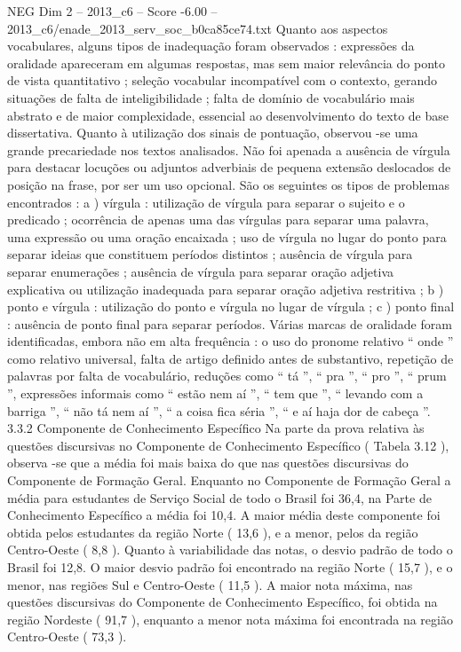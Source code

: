 \begin{textsample}{NEG Dim 2 – 2013\_c6 – Score -6.00 – 2013\_c6/enade\_2013\_serv\_soc\_b0ca85ce74.txt}
Quanto aos aspectos vocabulares, alguns tipos de inadequação foram observados : expressões da oralidade apareceram em algumas respostas, mas sem maior relevância do ponto de vista quantitativo ; seleção vocabular incompatível com o contexto, gerando situações de falta de inteligibilidade ; falta de domínio de vocabulário mais abstrato e de maior complexidade, essencial ao desenvolvimento do texto de base dissertativa.
Quanto à utilização dos sinais de pontuação, observou -se uma grande precariedade nos textos analisados.
Não foi apenada a ausência de vírgula para destacar locuções ou adjuntos adverbiais de pequena extensão deslocados de posição na frase, por ser um uso opcional.
São os seguintes os tipos de problemas encontrados : a ) vírgula : utilização de vírgula para separar o sujeito e o predicado ; ocorrência de apenas uma das vírgulas para separar uma palavra, uma expressão ou uma oração encaixada ; uso de vírgula no lugar do ponto para separar ideias que constituem períodos distintos ; ausência de vírgula para separar enumerações ; ausência de vírgula para separar oração adjetiva explicativa ou utilização inadequada para separar oração adjetiva restritiva ; b ) ponto e vírgula : utilização do ponto e vírgula no lugar de vírgula ; c ) ponto final : ausência de ponto final para separar períodos.
Várias marcas de oralidade foram identificadas, embora não em alta frequência : o uso do pronome relativo “ onde ” como relativo universal, falta de artigo definido antes de substantivo, repetição de palavras por falta de vocabulário, reduções como “ tá ”, “ pra ”, “ pro ”, “ prum ”, expressões informais como “ estão nem aí ”, “ tem que ”, “ levando com a barriga ”, “ não tá nem aí ”, “ a coisa fica séria ”, “ e aí haja dor de cabeça ”. 3.3.2 Componente de Conhecimento Específico Na parte da prova relativa às questões discursivas no Componente de Conhecimento Específico ( Tabela 3.12 ), observa -se que a média foi mais baixa do que nas questões discursivas do Componente de Formação Geral.
Enquanto no Componente de Formação Geral a média para estudantes de Serviço Social de todo o Brasil foi 36,4, na Parte de Conhecimento Específico a média foi 10,4.
A maior média deste componente foi obtida pelos estudantes da região Norte ( 13,6 ), e a menor, pelos da região Centro-Oeste ( 8,8 ).
Quanto à variabilidade das notas, o desvio padrão de todo o Brasil foi 12,8.
O maior desvio padrão foi encontrado na região Norte ( 15,7 ), e o menor, nas regiões Sul e Centro-Oeste ( 11,5 ).
A maior nota máxima, nas questões discursivas do Componente de Conhecimento Específico, foi obtida na região Nordeste ( 91,7 ), enquanto a menor nota máxima foi encontrada na região Centro-Oeste ( 73,3 ).

\end{textsample}
